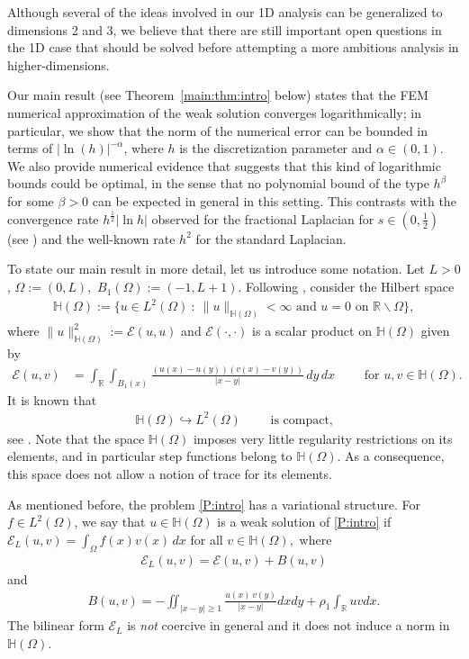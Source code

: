 \documentclass[11 pt]{article}
\numberwithin{equation}{section}
\def\R{\mathbb{R}}
\def\mH{\mathbb{H}}
\def\cE{\mathcal{E}}
\begin{document}
Although several of the ideas involved in our 1D analysis can be generalized to dimensions 2 and 3, we believe that there are still important open questions in the 1D case that should be solved before attempting a more ambitious analysis in higher-dimensions.

Our main result (see Theorem~\ref{main:thm:intro} below) states that the FEM numerical approximation of the weak solution converges logarithmically; in particular, we show that the norm of the numerical error can be bounded in terms of $|\ln(h)|^{-\alpha}$, where $h$ is the discretization parameter and $\alpha\in(0,1)$. We also provide numerical evidence that suggests that this kind of logarithmic bounds could be optimal, in the sense that no polynomial bound of the type $h^\beta$ for some $\beta>0$ can be expected in general in this setting.  This contrasts with the convergence rate $h^\frac{1}{2}|\ln h|$ observed for the fractional Laplacian for $s\in(0,\frac{1}{2})$ (see \cite[Theorem 3.31]{Bor17}) and the well-known rate $h^2$ for the standard Laplacian.

To state our main result in more detail, let us introduce some notation. Let $L>0$, $\Omega:=(0,L),$ $B_1(\Omega):=(-1,L+1)$. Following \cite{CW19}, consider the Hilbert space
\begin{align*}
\mH(\Omega):=\{u\in L^2(\Omega)\::\: \|u\|_{\mathbb H(\Omega)}<\infty \text{ and }u=0\text{ on }\R\backslash \Omega\},
\end{align*}
where $\|u\|^2_{\mathbb H(\Omega)}:={\mathcal E}(u,u)$ and ${\mathcal E}(\cdot,\cdot)$ is a scalar product on $\mathbb H(\Omega)$ given by
\begin{align*}
    {\mathcal E}(u,v)&=\int_{\R}\int_{B_1(x)}\frac{(u(x)-u(y))(v(x)-v(y))}{|x-y|}\, dy\, dx \qquad \text{ for }u,v\in \mH(\Omega).
\end{align*}
It is known that
\begin{align}\label{c:em}
\mathbb H(\Omega)\hookrightarrow L^2(\Omega)\qquad \text{ is compact,}
\end{align}
see \cite[Theorem 2.1]{CdP18}. Note that the space $\mH(\Omega)$ imposes very little regularity restrictions on its elements, and in particular step functions belong to $\mH(\Omega)$. As a consequence, this space does not allow a notion of trace for its elements.

As mentioned before, the problem \eqref{P:intro} has a variational structure. For $f\in L^2(\Omega)$, we say that $u\in \mH(\Omega)$ is a weak solution of \eqref{P:intro} if $    \cE_{L}(u,v)=\int_{\Omega} f(x) v(x)\, dx$ for all $v\in  \mH(\Omega),$ where
\begin{align}\label{cEL:def}
\cE_L(u,v)=\cE(u,v)+B(u,v) 
\end{align}
and
\begin{align}\label{eq:bilinear_B}
    B(u,v)=-\iint_{|x-y|\geq 1}\frac{u(x)\,v(y)}{|x-y|}dx dy+\rho_1\int_{\R}u v dx.
\end{align}
 The bilinear form $\cE_L$ is \emph{not} coercive in general and it does not induce a norm in $\mH(\Omega)$.
\end{document}
